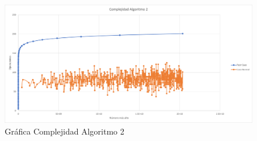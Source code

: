         \begin{figure}[htp!]
            \centering
            \includegraphics[width=1 \textwidth]{Images/Graf_Normal2.png}  
            \caption{Gráfica Complejidad Algoritmo 2}
            \label{fig:my_label}
        \end{figure}
        
        
    

